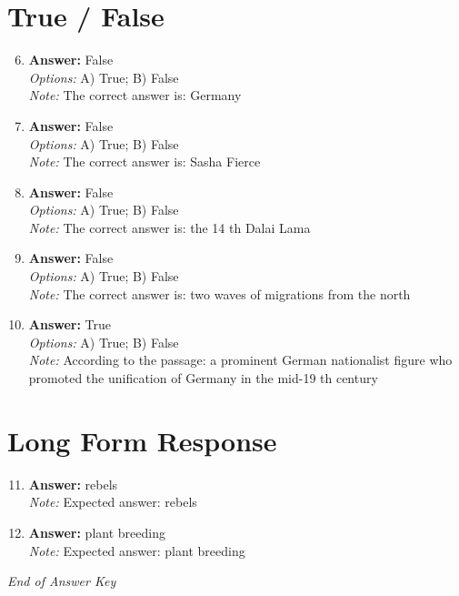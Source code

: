 \documentclass[12pt]{article}
\begin{document}
\section*{True / False}
\begin{enumerate}[label=\arabic*.]
\setcounter{enumi}{5}
\item \textbf{Answer:} False
\\ \textit{Options:} A) True; B) False
\\ \textit{Note:} The correct answer is: Germany
\item \textbf{Answer:} False
\\ \textit{Options:} A) True; B) False
\\ \textit{Note:} The correct answer is: Sasha Fierce
\item \textbf{Answer:} False
\\ \textit{Options:} A) True; B) False
\\ \textit{Note:} The correct answer is: the 14 th Dalai Lama
\item \textbf{Answer:} False
\\ \textit{Options:} A) True; B) False
\\ \textit{Note:} The correct answer is: two waves of migrations from the north
\item \textbf{Answer:} True
\\ \textit{Options:} A) True; B) False
\\ \textit{Note:} According to the passage: a prominent German nationalist figure who promoted the unification of Germany in the mid-19 th century
\end{enumerate}

\section*{Long Form Response}
\begin{enumerate}[label=\arabic*.]
\setcounter{enumi}{10}
\item \textbf{Answer:} rebels
\\ \textit{Note:} Expected answer: rebels
\item \textbf{Answer:} plant breeding
\\ \textit{Note:} Expected answer: plant breeding
\end{enumerate}

\vfill
\noindent\textit{End of Answer Key}
\end{document}
